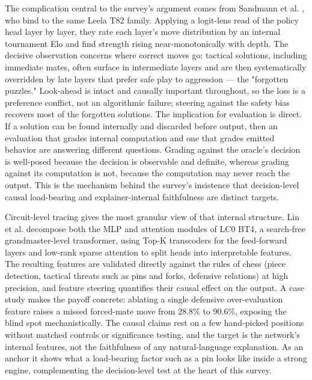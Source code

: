 \documentclass[conference]{IEEEtran}
\begin{document}
The complication central to the survey's argument comes from Sandmann et al. \cite{ref5}, who bind to the same Leela T82 family. Applying a logit-lens read of the policy head layer by layer, they rate each layer's move distribution by an internal tournament Elo and find strength rising near-monotonically with depth. The decisive observation concerns where correct moves go: tactical solutions, including immediate mates, often surface in intermediate layers and are then systematically overridden by late layers that prefer safe play to aggression --- the "forgotten puzzles." Look-ahead is intact and causally important throughout, so the loss is a preference conflict, not an algorithmic failure; steering against the safety bias recovers most of the forgotten solutions. The implication for evaluation is direct. If a solution can be found internally and discarded before output, then an evaluation that grades internal computation and one that grades emitted behavior are answering different questions. Grading against the oracle's decision is well-posed because the decision is observable and definite, whereas grading against its computation is not, because the computation may never reach the output. This is the mechanism behind the survey's insistence that decision-level causal load-bearing and explainer-internal faithfulness are distinct targets.

Circuit-level tracing gives the most granular view of that internal structure. Lin et al. \cite{ref6} decompose both the MLP and attention modules of LC0 BT4, a search-free grandmaster-level transformer, using Top-K transcoders for the feed-forward layers and low-rank sparse attention to split heads into interpretable features. The resulting features are validated directly against the rules of chess (piece detection, tactical threats such as pins and forks, defensive relations) at high precision, and feature steering quantifies their causal effect on the output. A case study makes the payoff concrete: ablating a single defensive over-evaluation feature raises a missed forced-mate move from 28.8\% to 90.6\%, exposing the blind spot mechanistically. The causal claims rest on a few hand-picked positions without matched controls or significance testing, and the target is the network's internal features, not the faithfulness of any natural-language explanation. As an anchor it shows what a load-bearing factor such as a pin looks like inside a strong engine, complementing the decision-level test at the heart of this survey.
\end{document}
